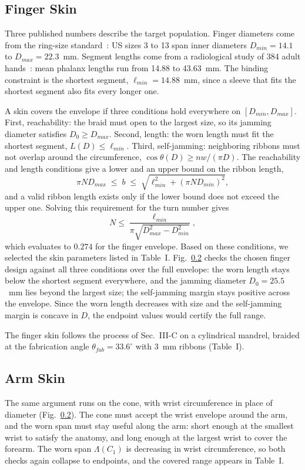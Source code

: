 \documentclass[letterpaper, 10 pt, conference]{ieeeconf}  %
\begin{document}
\subsection{Finger Skin}
Three published numbers describe the target population. Finger diameters come from the ring-size standard~\cite{iso8653}: US sizes 3 to 13 span inner diameters $D_{min} = 14.1$ to $D_{max} = 22.3$~mm. Segment lengths come from a radiological study of 384 adult hands~\cite{phalanx}: mean phalanx lengths run from 14.88 to 43.63~mm. The binding constraint is the shortest segment, $\ell_{min} = 14.88$~mm, since a sleeve that fits the shortest segment also fits every longer one.

A skin covers the envelope if three conditions hold everywhere on $[D_{min}, D_{max}]$. First, reachability: the braid must open to the largest size, so its jamming diameter satisfies $D_0 \geq D_{max}$. Second, length: the worn length must fit the shortest segment, $L(D) \leq \ell_{min}$. Third, self-jamming: neighboring ribbons must not overlap around the circumference, $\cos\theta(D) \geq nw/(\pi D)$.
The reachability and length conditions give a lower and an upper bound on the ribbon length,
\begin{equation}
\pi N D_{max} \;\leq\; b \;\leq\; \sqrt{\ell_{min}^2 + (\pi N D_{min})^2},
\end{equation}
and a valid ribbon length exists only if the lower bound does not exceed the upper one. Solving this requirement for the turn number gives
\begin{equation}
N \leq \frac{\ell_{min}}{\pi\sqrt{D_{max}^2 - D_{min}^2}},
\end{equation}
which evaluates to $0.274$ for the finger envelope. Based on these conditions, we selected the skin parameters listed in Table~I. Fig.~\ref{} checks the chosen finger design against all three conditions over the full envelope: the worn length stays below the shortest segment everywhere, and the jamming diameter $D_0 = 25.5$~mm lies beyond the largest size; the self-jamming margin stays positive across the envelope. Since the worn length decreases with size and the self-jamming margin is concave in $D$, the endpoint values would certify the full range.

The finger skin follows the process of Sec.~III-C on a cylindrical mandrel, braided at the fabrication angle $\theta_{fab} = 33.6^\circ$ with 3~mm ribbons (Table~I).

\subsection{Arm Skin}
The same argument runs on the cone, with wrist circumference in place of diameter (Fig.~\ref{}). The cone must accept the wrist envelope around the arm, and the worn span must stay useful along the arm: short enough at the smallest wrist to satisfy the anatomy, and long enough at the largest wrist to cover the forearm. The worn span $\Lambda(C_1)$ is decreasing in wrist circumference, so both checks again collapse to endpoints, and the covered range appears in Table~I.
\end{document}
